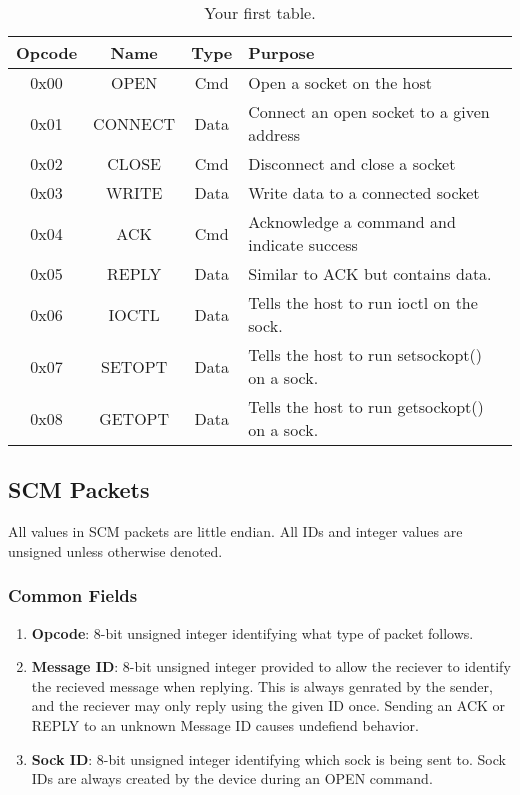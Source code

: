 \documentclass[pstricks,border=12pt,10pt]{article}
\begin{document}
	\begin{table}[h!]
		\begin{center}
			\caption{Your first table.}
			\label{tab:table1}
			\begin{tabular}{c|c|c|l} 
				\rowcolor{lightgray}
				\textbf{Opcode} &	\textbf{Name} &	\textbf{Type} & \textbf{Purpose}\\
				\hline
				0x00 & OPEN & Cmd & Open a socket on the host\\
				0x01 & CONNECT & Data & Connect an open socket to a given address\\
				0x02 & CLOSE & Cmd & Disconnect and close a socket\\
				0x03 & WRITE	 & Data & Write data to a connected socket\\
				0x04 & ACK	& Cmd & Acknowledge a command and indicate success\\
				0x05 & REPLY	& Data & Similar to ACK but contains data. \\
				0x06 & IOCTL	& Data & Tells the host to run ioctl on the sock. \\
				0x07 & SETOPT	& Data & Tells the host to run setsockopt() on a sock. \\
				0x08 & GETOPT	& Data & Tells the host to run getsockopt() on a sock. \\
			\end{tabular}
		\end{center}
	\end{table}

	\subsection{SCM Packets} \mbox{}
	All values in SCM packets are little endian. All IDs and integer values are unsigned unless otherwise denoted.
	\subsubsection{Common Fields}
	\begin{enumerate}
		\item \textbf{Opcode}: 8-bit unsigned integer identifying what type of packet follows.
		\item \textbf{Message ID}: 8-bit unsigned integer provided to allow the reciever to identify the recieved message when replying. This is always genrated by the sender, and the reciever may only reply using the given ID once. Sending an ACK or REPLY to an unknown Message ID causes undefiend behavior.
		\item \textbf{Sock ID}: 8-bit unsigned integer identifying which sock is being sent to. Sock IDs are always created by the device during an OPEN command.
	\end{enumerate}
\end{document}
